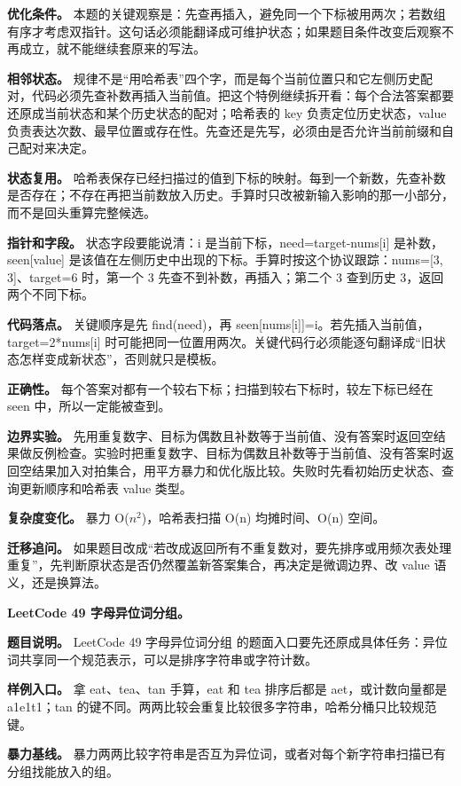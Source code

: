 \textbf{优化条件。} 本题的关键观察是：先查再插入，避免同一个下标被用两次；若数组有序才考虑双指针。这句话必须能翻译成可维护状态；如果题目条件改变后观察不再成立，就不能继续套原来的写法。

\textbf{相邻状态。} 规律不是“用哈希表”四个字，而是每个当前位置只和它左侧历史配对，代码必须先查补数再插入当前值。把这个特例继续拆开看：每个合法答案都要还原成当前状态和某个历史状态的配对；哈希表的 key 负责定位历史状态，value 负责表达次数、最早位置或存在性。先查还是先写，必须由是否允许当前前缀和自己配对来决定。

\textbf{状态复用。} 哈希表保存已经扫描过的值到下标的映射。每到一个新数，先查补数是否存在；不存在再把当前数放入历史。手算时只改被新输入影响的那一小部分，而不是回头重算完整候选。

\textbf{指针和字段。} 状态字段要能说清：i 是当前下标，need=target-nums[i] 是补数，seen[value] 是该值在左侧历史中出现的下标。手算时按这个协议跟踪：nums=[3, 3]、target=6 时，第一个 3 先查不到补数，再插入；第二个 3 查到历史 3，返回两个不同下标。

\textbf{代码落点。} 关键顺序是先 find(need)，再 seen[nums[i]]=i。若先插入当前值，target=2*nums[i] 时可能把同一位置用两次。关键代码行必须能逐句翻译成“旧状态怎样变成新状态”，否则就只是模板。

\textbf{正确性。} 每个答案对都有一个较右下标；扫描到较右下标时，较左下标已经在 seen 中，所以一定能被查到。

\textbf{边界实验。} 先用重复数字、目标为偶数且补数等于当前值、没有答案时返回空结果做反例检查。实验时把重复数字、目标为偶数且补数等于当前值、没有答案时返回空结果加入对拍集合，用平方暴力和优化版比较。失败时先看初始历史状态、查询更新顺序和哈希表 value 类型。

\textbf{复杂度变化。} 暴力 O(\ensuremath{n^{2}})，哈希表扫描 O(n) 均摊时间、O(n) 空间。

\textbf{迁移追问。} 如果题目改成“若改成返回所有不重复数对，要先排序或用频次表处理重复”，先判断原状态是否仍然覆盖新答案集合，再决定是微调边界、改 value 语义，还是换算法。

\noindent\textbf{LeetCode 49 字母异位词分组。}

\textbf{题目说明。} LeetCode 49 字母异位词分组 的题面入口要先还原成具体任务：异位词共享同一个规范表示，可以是排序字符串或字符计数。

\textbf{样例入口。} 拿 eat、tea、tan 手算，eat 和 tea 排序后都是 aet，或计数向量都是 a1e1t1；tan 的键不同。两两比较会重复比较很多字符串，哈希分桶只比较规范键。

\textbf{暴力基线。} 暴力两两比较字符串是否互为异位词，或者对每个新字符串扫描已有分组找能放入的组。

